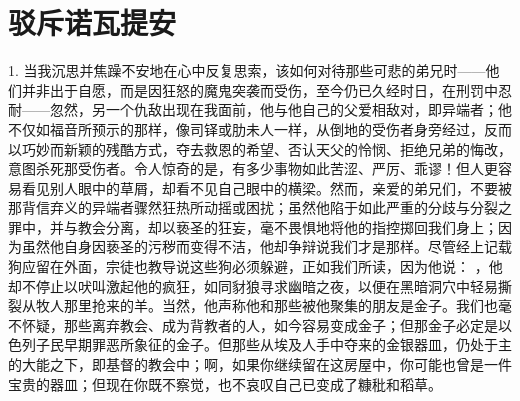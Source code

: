 
\chapter{驳斥诺瓦提安}


\par

1. 当我沉思并焦躁不安地在心中反复思索，该如何对待那些可悲的弟兄时——他们并非出于自愿，而是因狂怒的魔鬼突袭而受伤，至今仍已久经时日，在刑罚中忍耐——忽然，另一个仇敌出现在我面前，他与他自己的父爱相敌对，即异端者；他不仅如福音所预示的那样，像司铎或肋未人一样，从倒地的受伤者身旁经过，反而以巧妙而新颖的残酷方式，夺去救恩的希望、否认天父的怜悯、拒绝兄弟的悔改，意图杀死那受伤者。令人惊奇的是，有多少事物如此苦涩、严厉、乖谬！但人更容易看见别人眼中的草屑，却看不见自己眼中的横梁。然而，亲爱的弟兄们，不要被那背信弃义的异端者骤然狂热所动摇或困扰；虽然他陷于如此严重的分歧与分裂之罪中，并与教会分离，却以亵圣的狂妄，毫不畏惧地将他的指控掷回我们身上；因为虽然他自身因亵圣的污秽而变得不洁，他却争辩说我们才是那样。尽管经上记载狗应留在外面，宗徒也教导说这些狗必须躲避，正如我们所读，因为他说： ，他却不停止以吠叫激起他的疯狂，如同豺狼寻求幽暗之夜，以便在黑暗洞穴中轻易撕裂从牧人那里抢来的羊。当然，他声称他和那些被他聚集的朋友是金子。我们也毫不怀疑，那些离弃教会、成为背教者的人，如今容易变成金子；但那金子必定是以色列子民早期罪恶所象征的金子。但那些从埃及人手中夺来的金银器皿，仍处于主的大能之下，即基督的教会中；啊，如果你继续留在这房屋中，你可能也曾是一件宝贵的器皿；但现在你既不察觉，也不哀叹自己已变成了糠秕和稻草。\par

